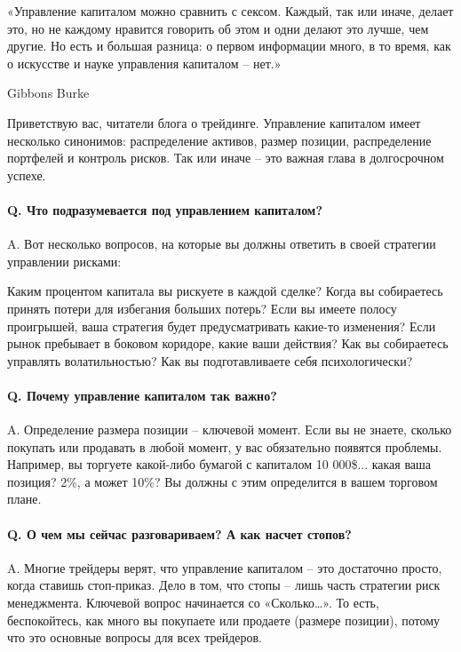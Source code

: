 \documentclass[a5paper]{article}
\begin{document}
    «Управление капиталом можно сравнить с сексом. Каждый, так или иначе, делает это, но не каждому нравится говорить об этом и одни делают это лучше, чем другие. Но есть и большая разница: о первом информации много, в то время, как о искусстве и науке управления капиталом – нет.»

    Gibbons Burke

Приветствую вас, читатели блога о трейдинге. Управление капиталом
имеет несколько синонимов: распределение активов, размер позиции,
распределение портфелей и контроль рисков. Так или иначе – это важная
глава в долгосрочном успехе.

\paragraph{Q. Что подразумевается под управлением капиталом?}

A. Вот несколько вопросов, на которые вы должны ответить в своей стратегии управлении рисками:

    Каким процентом капитала вы рискуете в каждой сделке?
    Когда вы собираетесь принять потери для избегания больших потерь?
    Если вы имеете полосу проигрышей, ваша стратегия будет предусматривать какие-то изменения?
    Если рынок пребывает в боковом коридоре, какие ваши действия?
    Как вы собираетесь управлять волатильностью?
    Как вы подготавливаете себя психологически?

\paragraph{Q. Почему управление капиталом так важно?}

A. Определение размера позиции – ключевой момент. Если вы не знаете,
сколько покупать или продавать в любой момент, у вас обязательно
появятся проблемы. Например, вы торгуете какой-либо бумагой с
капиталом 10 000\$... какая ваша позиция? 2\%, а может 10\%? Вы должны с
                                этим определится в вашем торговом
                                плане.

\paragraph{Q. О чем мы сейчас разговариваем? А как насчет стопов?}

A. Многие трейдеры верят, что управление капиталом – это достаточно
просто, когда ставишь стоп-приказ. Дело в том, что стопы – лишь часть
стратегии риск менеджмента. Ключевой вопрос начинается со
«Сколько…». То есть, беспокойтесь, как много вы покупаете или продаете
(размере позиции), потому что это основные вопросы для всех трейдеров.
\end{document}
